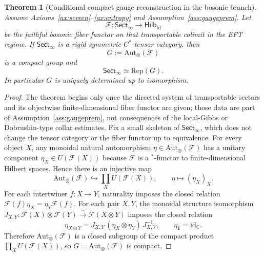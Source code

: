 \documentclass[11pt]{article}
\newtheorem{theorem}{Theorem}[section]
\begin{document}
\begin{theorem}[Conditional compact gauge reconstruction in the bosonic branch]\label{thm:compactgauge}
Assume Axioms~\ref{ax:screen}--\ref{ax:entropy} and Assumption~\ref{ass:gaugeprem}. Let
\[
\mathcal F:\mathsf{Sect}_\infty\to\mathsf{Hilb}_{\mathrm{fd}}
\]
be the faithful bosonic fiber functor on that transportable colimit in the EFT regime. If \(\mathsf{Sect}_\infty\) is a rigid symmetric \(C^*\)-tensor category, then
\[
G:=\mathrm{Aut}_\otimes(\mathcal F)
\]
is a compact group and
\[
\mathsf{Sect}_\infty\simeq \mathrm{Rep}(G).
\]
In particular \(G\) is uniquely determined up to isomorphism.
\end{theorem}

\begin{proof}
The theorem begins only once the directed system of transportable sectors and its objectwise finite-dimensional fiber functor are given; those data are part of Assumption~\ref{ass:gaugeprem}, not consequences of the local-Gibbs or Dobrushin-type collar estimates. Fix a small skeleton of \(\mathsf{Sect}_\infty\), which does not change the tensor category or the fiber functor up to equivalence. For every object \(X\), any monoidal natural automorphism \(\eta\in\mathrm{Aut}_\otimes(\mathcal F)\) has a unitary component \(\eta_X\in U(\mathcal F(X))\) because \(\mathcal F\) is a \(^*\)-functor to finite-dimensional Hilbert spaces. Hence there is an injective map
\[
\mathrm{Aut}_\otimes(\mathcal F)\hookrightarrow \prod_{X}U(\mathcal F(X)),\qquad
\eta\mapsto (\eta_X)_X.
\]
For each intertwiner \(f:X\to Y\), naturality imposes the closed relation \(\mathcal F(f)\eta_X=\eta_Y\mathcal F(f)\). For each pair \(X,Y\), the monoidal structure isomorphism \(J_{X,Y}:\mathcal F(X)\otimes\mathcal F(Y)\xrightarrow{\sim}\mathcal F(X\otimes Y)\) imposes the closed relation
\[
\eta_{X\otimes Y}=J_{X,Y}\,(\eta_X\otimes\eta_Y)\,J_{X,Y}^{-1},
\qquad
\eta_{\mathbf 1}=\mathrm{id}_{\mathbb C}.
\]
Therefore \(\mathrm{Aut}_\otimes(\mathcal F)\) is a closed subgroup of the compact product \(\prod_X U(\mathcal F(X))\), so \(G=\mathrm{Aut}_\otimes(\mathcal F)\) is compact.


\end{proof}
\end{document}
